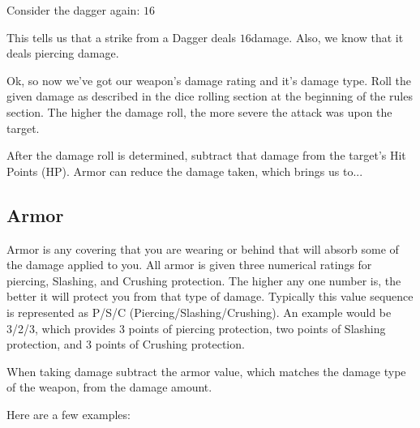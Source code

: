 \documentclass[twoside]{book}
\begin{document}
    {  
    Consider the dagger again: \ensuremath{1}\ensuremath{6}\ensuremath{} 
    }
  
    {  
    This tells us that a strike from a Dagger deals \ensuremath{1}\ensuremath{6}\ensuremath{}damage. Also, we know that it deals piercing damage.
               
    }
  
    {  
    Ok, so now we've got our weapon's damage
               rating and it's damage type. Roll the given damage
               as described in the dice rolling section at the beginning
               of the rules section. The higher the damage roll, the more
               severe the attack was upon the target. 
    }
  
    {  
    After the damage roll is determined, subtract that
               damage from the target's Hit Points (HP). Armor can
               reduce the damage taken, which brings us to...
               
    }
  
    

\subsection{Armor}
    
    {  
    Armor is any covering that you are wearing or behind
               that will absorb some of the damage applied to you. All
               armor is given three numerical ratings for piercing,
               Slashing, and Crushing protection. The higher any one
               number is, the better it will protect you from that type
               of damage. Typically this value sequence is represented as
               P/S/C (Piercing/Slashing/Crushing). An example would be
               3/2/3, which provides 3 points of piercing protection, two
               points of Slashing protection, and 3 points of Crushing
               protection. 
    }
  
    {  
    When taking damage subtract the armor value, which
               matches the damage type of the weapon, from the damage
               amount. 
    }
  
    {  
    Here are a few examples: 
    }
  
  
\end{document}
